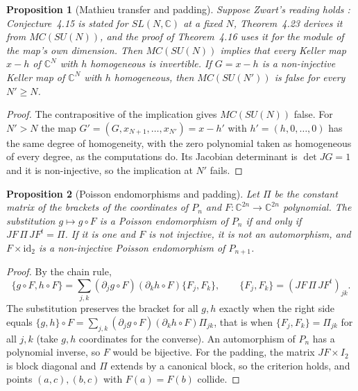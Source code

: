 \documentclass[11pt]{article}
\newtheorem{proposition}{Proposition}
\theoremstyle{remark}
\newcommand{\C}{\mathbb{C}}
\begin{document}
\begin{proposition}[Mathieu transfer and padding]\label{prop:mathieu}
Suppose Zwart's reading holds \cite[Conjecture~4.15 and the proof of Theorem~4.16, pp.~39--40; Theorem~4.23, p.~43]{Zwart2025}: Conjecture~4.15 is stated for $SL(N,\C)$ at a fixed $N$, Theorem~4.23 derives it from $MC(SU(N))$, and the proof of Theorem~4.16 uses it for the module of the map's own dimension. Then $MC(SU(N))$ implies that every Keller map $x-h$ of $\C^N$ with $h$ homogeneous is invertible. If $G=x-h$ is a non-injective Keller map of $\C^N$ with $h$ homogeneous, then $MC(SU(N'))$ is false for every $N'\ge N$.
\end{proposition}
\begin{proof}
The contrapositive of the implication gives $MC(SU(N))$ false. For $N'>N$ the map $G'=(G,x_{N+1},\dots,x_{N'})=x-h'$ with $h'=(h,0,\dots,0)$ has the same degree of homogeneity, with the zero polynomial taken as homogeneous of every degree, as the computations do. Its Jacobian determinant is $\det JG=1$ and it is non-injective, so the implication at $N'$ fails. \qedhere
\end{proof}

\begin{proposition}[Poisson endomorphisms and padding]\label{prop:poisson}
Let $\Pi$ be the constant matrix of the brackets of the coordinates of $P_n$ and $F:\C^{2n}\to\C^{2n}$ polynomial. The substitution $g\mapsto g\circ F$ is a Poisson endomorphism of $P_n$ if and only if $JF\,\Pi\,JF^t=\Pi$. If it is one and $F$ is not injective, it is not an automorphism, and $F\times\mathrm{id}_2$ is a non-injective Poisson endomorphism of $P_{n+1}$.
\end{proposition}
\begin{proof}
By the chain rule,
\begin{equation}\label{eq:chain}
\{g\circ F,h\circ F\}=\sum_{j,k}(\partial_jg\circ F)(\partial_kh\circ F)\{F_j,F_k\},\qquad \{F_j,F_k\}=(JF\,\Pi\,JF^t)_{jk}.
\end{equation}
The substitution preserves the bracket for all $g,h$ exactly when the right side equals $\{g,h\}\circ F=\sum_{j,k}(\partial_jg\circ F)(\partial_kh\circ F)\Pi_{jk}$, that is when $\{F_j,F_k\}=\Pi_{jk}$ for all $j,k$ (take $g,h$ coordinates for the converse). An automorphism of $P_n$ has a polynomial inverse, so $F$ would be bijective. For the padding, the matrix $JF\times I_2$ is block diagonal and $\Pi$ extends by a canonical block, so the criterion holds, and points $(a,c),(b,c)$ with $F(a)=F(b)$ collide. \qedhere
\end{proof}
\end{document}
